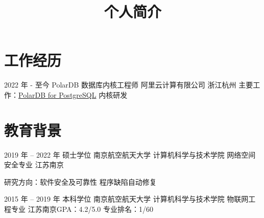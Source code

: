 \documentclass[11pt,a4paper,sans]{moderncv}   %
\title{个人简介}                     %
\begin{document}
\begin{CJK}{UTF8}{gbsn}                       %
\maketitle


\section{工作经历}
\cventry
{2022 年 - 至今}
{PolarDB 数据库内核工程师}
{阿里云计算有限公司}
{浙江杭州}
{}{主要工作：\href{https://github.com/ApsaraDB/PolarDB-for-PostgreSQL}{PolarDB for PostgreSQL} 内核研发}

\section{教育背景}
\cventry
{2019 年 -- 2022 年}
{硕士学位}
{南京航空航天大学 计算机科学与技术学院 网络空间安全专业}
{江苏南京}{}{
  研究方向：软件安全及可靠性 程序缺陷自动修复
  \scriptsize
}  %
\cventry
{2015 年 -- 2019 年}
{本科学位}
{南京航空航天大学 计算机科学与技术学院 物联网工程专业}
{江苏南京}{}{GPA：4.2/5.0 专业排名：1/60}



\end{CJK}
\end{document}
